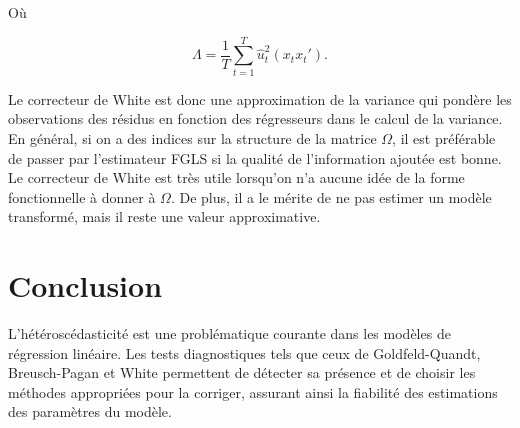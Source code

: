 \documentclass[14pt]{extarticle} %
\theoremstyle{definition}
\theoremstyle{plain}
\begin{document}
Où

\[
\Lambda = \frac{1}{T} \sum_{t=1}^T \hat{u}_t^2 \left( x_t x_t' \right).
\]

Le correcteur de White est donc une approximation de la variance qui pondère les observations des résidus en fonction des régresseurs dans le calcul de la variance. En général, si on a des indices sur la structure de la matrice $\Omega$, il est préférable de passer par l’estimateur FGLS si la qualité de l’information ajoutée est bonne. Le correcteur de White est très utile lorsqu’on n’a aucune idée de la forme fonctionnelle à donner à $\Omega$. De plus, il a le mérite de ne pas estimer un modèle transformé, mais il reste une valeur approximative.

\section{Conclusion}
L'hétéroscédasticité est une problématique courante dans les modèles de régression linéaire. Les tests diagnostiques tels que ceux de Goldfeld-Quandt, Breusch-Pagan et White permettent de détecter sa présence et de choisir les méthodes appropriées pour la corriger, assurant ainsi la fiabilité des estimations des paramètres du modèle.

\printbibliography
\end{document}
